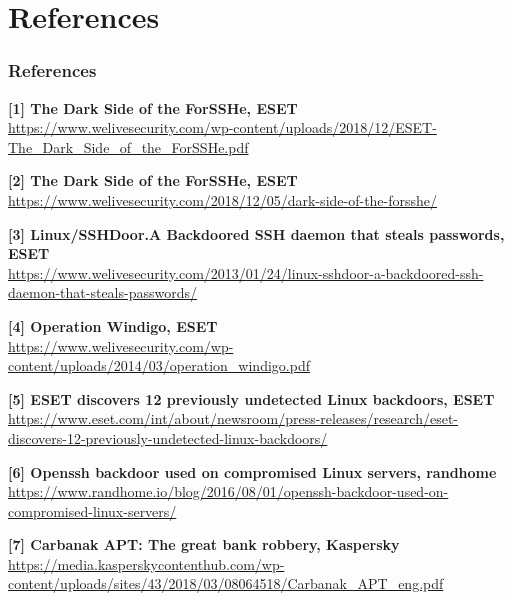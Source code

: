 \documentclass[11pt,svgnames,smaller]{beamer}
\begin{document}
	\section{References}
	\begin{frame}
		\frametitle{References}
		
		\footnotesize
		
    \textbf{[1] The Dark Side of the ForSSHe, ESET}\\
    \url{https://www.welivesecurity.com/wp-content/uploads/2018/12/ESET-The_Dark_Side_of_the_ForSSHe.pdf}

    \smallskip

    \textbf{[2] The Dark Side of the ForSSHe, ESET}\\
    \url{https://www.welivesecurity.com/2018/12/05/dark-side-of-the-forsshe/}

    \smallskip

    \textbf{[3] Linux/SSHDoor.A Backdoored SSH daemon that steals passwords, ESET}\\
    \url{https://www.welivesecurity.com/2013/01/24/linux-sshdoor-a-backdoored-ssh-daemon-that-steals-passwords/}

    \smallskip

    \textbf{[4] Operation Windigo, ESET}\\
    \url{https://www.welivesecurity.com/wp-content/uploads/2014/03/operation_windigo.pdf}

    \smallskip

    \textbf{[5] ESET discovers 12 previously undetected Linux backdoors, ESET}\\
    \url{https://www.eset.com/int/about/newsroom/press-releases/research/eset-discovers-12-previously-undetected-linux-backdoors/}

    \smallskip

    \textbf{[6] Openssh backdoor used on compromised Linux servers, randhome}\\
    \url{https://www.randhome.io/blog/2016/08/01/openssh-backdoor-used-on-compromised-linux-servers/}

    \smallskip

    \textbf{[7] Carbanak APT: The great bank robbery, Kaspersky}\\
    \url{https://media.kasperskycontenthub.com/wp-content/uploads/sites/43/2018/03/08064518/Carbanak_APT_eng.pdf}


 	\end{frame}
  
\end{document}
